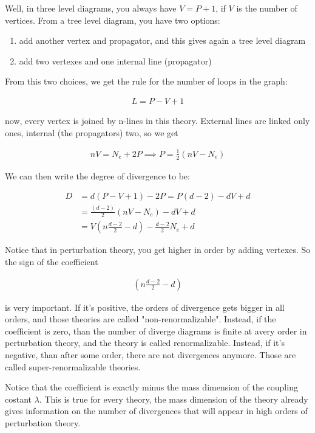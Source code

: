 \documentclass{report}
\begin{document}
Well, in three level diagrams, you always have \(V = P+1\), if \(V\) is the number of vertices. From a tree level diagram, you have two options: 

\begin{enumerate}
    \item add another vertex and propagator, and this gives again a tree level diagram 
    \item add two vertexes and one internal line (propagator)
\end{enumerate}

From this two choices, we get the rule for the number of loops in the graph: 

\begin{align}
    L = P- V+1
\end{align}

now, every vertex is joined by n-lines in this theory. External lines are linked only ones, internal (the propagators) two, so we get 

\begin{align}
    nV = N_e +2P \implies P = \frac{1}{2}(nV - N_e)
\end{align}

We can then write the degree of divergence to be: 

\begin{align}
    D &= d(P-V+1) - 2P = P(d-2) -dV +d \\
    &= \frac{(d-2)}{2}(nV-N_e) -dV + d \\
    &= V\left(n\frac{d-2}{2} -d \right) -\frac{d-2}{2}N_e + d
\end{align}

Notice that in perturbation theory, you get higher in order by adding vertexes. So the sign of the coefficient 

\begin{align}
    \left(n\frac{d-2}{2} -d \right)
\end{align}

is very important. If it's positive, the orders of divergence gets bigger in all orders, and those theories are called "non-renormalizable". Instead, if the coefficient is zero, than the number of diverge diagrams is finite at avery order in perturbation theory, and the theory is called renormalizable. Instead, if it's negative, than after some order, there are not divergences anymore. Those are called super-renormalizable theories. 

Notice that the coefficient is exactly minus the mass dimension of the coupling costant \(\lambda\). This is true for every theory, the mass dimension of the theory already gives information on the number of divergences that will appear in high orders of perturbation theory.  
\end{document}
